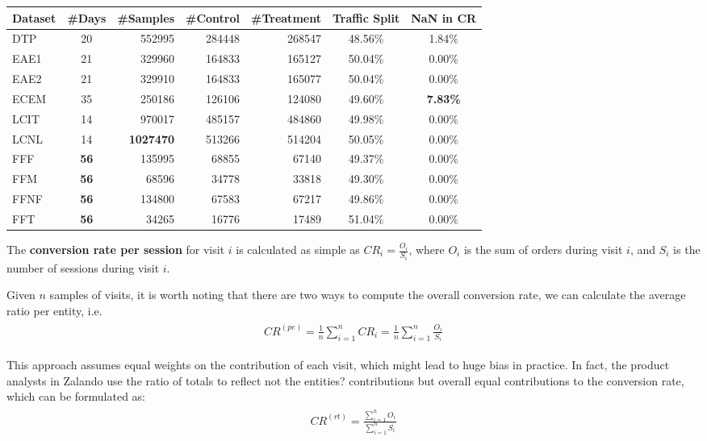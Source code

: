 \documentclass[paper=a4, fontsize=11pt]{scrartcl} %
\numberwithin{equation}{section} %
\numberwithin{figure}{section} %
\numberwithin{table}{section} %
\begin{document}
\begin{center}
  \begin{tabular}{ | l | c | r | r | r | c | c |}
    \hline
    \textbf{Dataset} & \textbf{\#Days}  & \textbf{\#Samples} & \textbf{\#Control} & \textbf{\#Treatment} &  \textbf{Traffic Split} & \textbf{NaN in CR} \\ \hline\hline
     DTP & 20 & 552995 & 284448 & 268547 & 48.56\% & 1.84\% \\ \hline
     EAE1 & 21 & 329960 & 164833 & 165127 & 50.04\% & 0.00\% \\ \hline
     EAE2 & 21 & 329910 & 164833 & 165077 & 50.04\% & 0.00\% \\ \hline
     ECEM & 35 & 250186 & 126106 & 124080 & 49.60\% & \textbf{7.83\%} \\ \hline
     LCIT & 14 & 970017 & 485157 & 484860 & 49.98\% & 0.00\% \\ \hline
     LCNL & 14 & \textbf{1027470} & 513266 & 514204 & 50.05\% & 0.00\% \\ \hline
     FFF & \textbf{56} & 135995 & 68855 & 67140 & 49.37\% & 0.00\% \\ \hline
     FFM & \textbf{56} & 68596 & 34778 & 33818 & 49.30\% & 0.00\% \\ \hline
     FFNF & \textbf{56} & 134800 & 67583 & 67217 & 49.86\% & 0.00\% \\ \hline
     FFT & \textbf{56} & 34265 & 16776 & 17489 & 51.04\% & 0.00\% \\ \hline
  \end{tabular}
\end{center}

The \textbf{conversion rate per session} for visit $i$ is calculated as simple as $CR_i = \frac{O_i}{S_i}$, where $O_i$ is the sum of orders during visit $i$, and $S_i$ is the number of sessions during visit $i$.

Given $n$ samples of visits, it is worth noting that there are two ways to compute the overall conversion rate, we can calculate the average ratio per entity, i.e.
\begin{align} 
\begin{split}
CR^{(pe)} = \frac{1}{n} \sum_{i=1}^{n} CR_i = \frac{1}{n} \sum_{i=1}^{n} \frac{O_i}{S_i}
\end{split}					
\end{align}

This approach assumes equal weights on the contribution of each visit, which might lead to huge bias in practice. In fact, the product analysts in Zalando use the ratio of totals to reflect not the entities? contributions but overall equal contributions to the conversion rate, which can be formulated as:
\begin{align} 
\begin{split}
CR^{(rt)} = \frac{\sum_{i=1}^{n}O_i}{\sum_{i=1}^{n}S_i} 
\end{split}					
\end{align}
\end{document}
